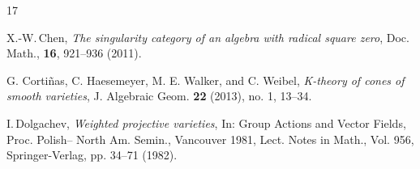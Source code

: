 \documentclass[a4paper,11pt, reqno]{amsart}
\theoremstyle{plain}
\theoremstyle{definition}
\numberwithin{equation}{section}
\newcommand{\blue}[1]{\leavevmode{\color{blue}{#1}}}
\begin{document}
\begin{thebibliography}{17}


X.-W.\,Chen, 
{\it The singularity category of an algebra with radical square zero}, 
Doc. Math., \textbf{16}, 921--936 (2011).



G. Corti{\~n}as, C. Haesemeyer, M. E. Walker, and C. Weibel, {\it K-theory of cones of smooth
varieties}, J. Algebraic Geom. \textbf{22} (2013), no. 1, 13--34.



I.\,Dolgachev, {\it Weighted projective varieties}, 
In: Group Actions and Vector Fields, Proc. Polish– North Am. Semin., Vancouver 1981, Lect. Notes in Math., Vol. 956, Springer-Verlag, pp. 34--71 (1982).








\end{thebibliography}
\end{document}
